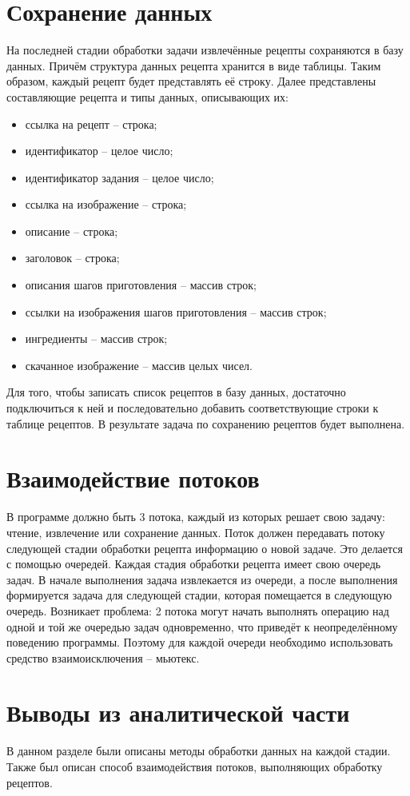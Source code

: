 \section{Сохранение данных}
На последней стадии обработки задачи извлечённые рецепты сохраняются в базу данных.
Причём структура данных рецепта хранится в виде таблицы.
Таким образом, каждый рецепт будет представлять её строку.
Далее представлены составляющие рецепта и типы данных, описывающих их:
\begin{itemize}
    \item ссылка на рецепт -- строка;
    \item идентификатор -- целое число;
    \item идентификатор задания -- целое число;
    \item ссылка на изображение -- строка;
    \item описание -- строка;
    \item заголовок -- строка;
    \item описания шагов приготовления -- массив строк;
    \item ссылки на изображения шагов приготовления -- массив строк;
    \item ингредиенты -- массив строк;
    \item скачанное изображение -- массив целых чисел.
\end{itemize} 
Для того, чтобы записать список рецептов в базу данных, достаточно подключиться к ней и последовательно добавить соответствующие строки к таблице рецептов.
В результате задача по сохранению рецептов будет выполнена.

\section{Взаимодействие потоков}
В программе должно быть 3 потока, каждый из которых решает свою задачу: чтение, извлечение или сохранение данных.
Поток должен передавать потоку следующей стадии обработки рецепта информацию о новой задаче.
Это делается с помощью очередей.
Каждая стадия обработки рецепта имеет свою очередь задач.
В начале выполнения задача извлекается из очереди, а после выполнения формируется задача для следующей стадии, которая помещается в следующую очередь.
Возникает проблема: 2 потока могут начать выполнять операцию над одной и той же очередью задач одновременно, что приведёт к неопределённому поведению программы.
Поэтому для каждой очереди необходимо использовать средство взаимоисключения -- мьютекс.

\section*{Выводы из аналитической части}
В данном разделе были описаны методы обработки данных на каждой стадии.
Также был описан способ взаимодействия потоков, выполняющих обработку рецептов.